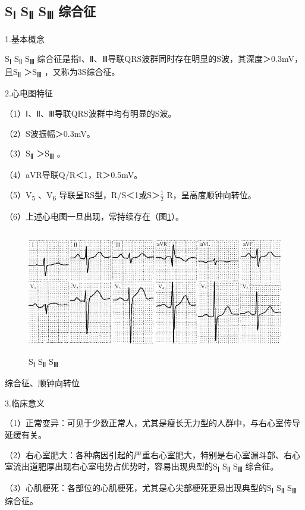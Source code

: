 \protect\hypertarget{text00009.htmlux5cux23subid51}{}{}

\subsection{S\textsubscript{Ⅰ} S\textsubscript{Ⅱ} S\textsubscript{Ⅲ} 综合征}

1.基本概念

S\textsubscript{Ⅰ} S\textsubscript{Ⅱ} S\textsubscript{Ⅲ}
综合征是指Ⅰ、Ⅱ、Ⅲ导联QRS波群同时存在明显的S波，其深度＞0.3mV，且S\textsubscript{Ⅱ}
＞S\textsubscript{Ⅲ} ，又称为3S综合征。

2.心电图特征

（1）Ⅰ、Ⅱ、Ⅲ导联QRS波群中均有明显的S波。

（2）S波振幅＞0.3mV。

（3）S\textsubscript{Ⅱ} ＞S\textsubscript{Ⅲ} 。

（4）aVR导联Q/R＜1，R＞0.5mV。

（5）V\textsubscript{5} 、V\textsubscript{6}
导联呈RS型，R/S＜1或S＞$\frac{1}{2}$
R，呈高度顺钟向转位。

（6）上述心电图一旦出现，常持续存在（图\ref{fig3-10}）。

\begin{figure}[!htbp]
 \centering
 \includegraphics[width=5.1875in,height=2.14583in]{./images/Image00060.jpg}
 \captionsetup{justification=centering}
 \caption{S\textsubscript{Ⅰ} S\textsubscript{Ⅱ} S\textsubscript{Ⅲ}}
 \label{fig3-10}
  \end{figure} 
综合征、顺钟向转位

3.临床意义

（1）正常变异：可见于少数正常人，尤其是瘦长无力型的人群中，与右心室传导延缓有关。

（2）右心室肥大：各种病因引起的严重右心室肥大，特别是右心室漏斗部、右心室流出道肥厚出现右心室电势占优势时，容易出现典型的S\textsubscript{Ⅰ}
S\textsubscript{Ⅱ} S\textsubscript{Ⅲ} 综合征。

（3）心肌梗死：各部位的心肌梗死，尤其是心尖部梗死更易出现典型的S\textsubscript{Ⅰ}
S\textsubscript{Ⅱ} S\textsubscript{Ⅲ} 综合征。

